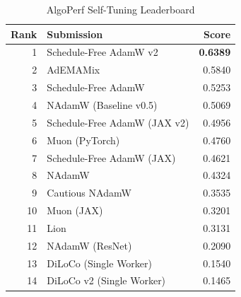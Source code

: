 \begin{table}[h]
  \centering
  \caption{AlgoPerf Self-Tuning Leaderboard}
  \label{tab:scores}
  \begin{tabular}{rlr}
    \toprule
    Rank & Submission & Score \\
    \midrule
    1 & Schedule-Free AdamW v2 & \textbf{0.6389} \\
    2 & AdEMAMix & 0.5840 \\
    3 & Schedule-Free AdamW & 0.5253 \\
    4 & NAdamW (Baseline v0.5) & 0.5069 \\
    5 & Schedule-Free AdamW (JAX v2) & 0.4956 \\
    6 & Muon (PyTorch) & 0.4760 \\
    7 & Schedule-Free AdamW (JAX) & 0.4621 \\
    8 & NAdamW & 0.4324 \\
    9 & Cautious NAdamW & 0.3535 \\
    10 & Muon (JAX) & 0.3201 \\
    11 & Lion & 0.3131 \\
    12 & NAdamW (ResNet) & 0.2090 \\
    13 & DiLoCo (Single Worker) & 0.1540 \\
    14 & DiLoCo v2 (Single Worker) & 0.1465 \\
    \bottomrule
  \end{tabular}
\end{table}